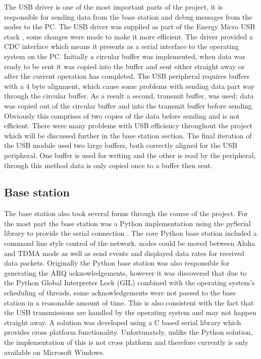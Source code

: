 \documentclass[parskip]{cs4rep}
\begin{document}
The USB driver is one of the most important parts of the project, it is responsible for sending data from the base station and debug messages from the nodes to the PC. The USB driver was supplied as part of the Energy Micro USB stack \cite{W1}, some changes were made to make it more efficient. The driver provided a CDC interface which means it presents as a serial interface to the operating system on the PC. Initially a circular buffer was implemented, when data was ready to be sent it was copied into the buffer and sent either straight away or after the current operation has completed. The USB peripheral requires buffers with a 4 byte alignment, which cause some problems with sending data part way through the circular buffer. As a result a second, transmit buffer, was used; data was copied out of the circular buffer and into the transmit buffer before sending. Obviously this comprises of two copies of the data before sending and is not efficient. There were many problems with USB efficiency throughout the project which will be discussed further in the base station section. The final iteration of the USB module used two large buffers, both correctly aligned for the USB peripheral. One buffer is used for writing and the other is read by the peripheral, through this method data is only copied once to a buffer then sent. 

\subsection{Base station}

The base station also took several forms through the course of the project. For the most part the base station was a Python implementation using the pySerial library to provide the serial connection \cite{W2}. The core Python base station included a command line style control of the network, nodes could be moved between Aloha and TDMA mode as well as send events and displayed data rates for received data packets. Originally the Python base station was also responsible for generating the ARQ acknowledgements, however it was discovered that due to the Python Global Interpreter Lock (GIL) \cite{W3} combined with the operating system's scheduling of threads, some acknowledgements were not passed to the base station in a reasonable amount of time. This is also consistent with the fact that the USB transmissions are handled by the operating system and may not happen straight away. A solution was developed using a C based serial library \cite{W4} which provides cross platform functionality. Unfortunately, unlike the Python solution, the implementation of this is not cross platform and therefore currently is only available on Microsoft Windows.
\end{document}
